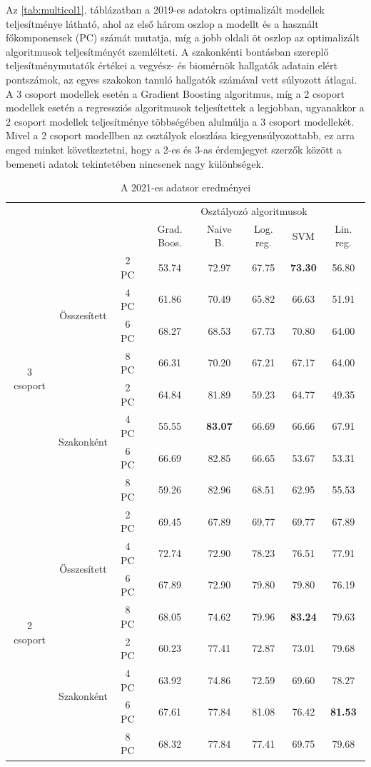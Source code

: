 \documentclass[12pt]{article}
\begin{document}
Az \ref{tab:multicol1}. táblázatban a 2019-es adatokra optimalizált modellek teljesítménye látható, ahol az első három oszlop a modellt és a használt főkomponensek (PC) számát mutatja, míg a jobb oldali öt oszlop az optimalizált algoritmusok teljesítményét szemlélteti. A szakonkénti bontásban szereplő teljesítménymutatók értékei a vegyész- és biomérnök hallgatók adatain elért pontszámok, az egyes szakokon tanuló hallgatók számával vett súlyozott átlagai. A 3 csoport modellek esetén a Gradient Boosting algoritmus, míg a 2 csoport modellek esetén a regressziós algoritmusok teljesítettek a legjobban, ugyanakkor a 2 csoport modellek teljesítménye többségében alulmúlja a 3 csoport modellekét. Mivel a 2 csoport modellben az osztályok eloszlása kiegyensúlyozottabb, ez arra enged minket következtetni, hogy a 2-es és 3-as érdemjegyet szerzők között a bemeneti adatok tekintetében nincsenek nagy különbségek.

\begin{table}[H]
\centering
\begin{tabular}{ccc|ccccc}

    &&&\multicolumn{5}{c}{Osztályozó algoritmusok} \\
    &&& Grad. Boos. &  Naive B. & Log. reg.  &  SVM & Lin. reg. \\ 
        \hline
    \multirow{8}{*}{3 csoport}& \multirow{4}{*}{Összesített}&2 PC&53.74&72.97&67.75&\textbf{73.30}&56.80 \\
    												&&4 PC&61.86&70.49&65.82&66.63&51.91\\
    												&&6 PC&68.27&68.53&67.73&70.80&64.00\\
    												&&8 PC&66.31&70.20&67.21&67.17&64.00\\\cline{3-8}%
    						 & \multirow{4}{*}{Szakonként}&2 PC&64.84&81.89&59.23&64.77&49.35\\
    												&&4 PC&55.55&\textbf{83.07}&66.69&66.66&67.91\\
    												&&6 PC&66.69&82.85&66.65&53.67&53.31\\
    												&&8 PC&59.26&82.96&68.51&62.95&55.53\\
    \hline
    \hline
    \multirow{8}{*}{2 csoport}& \multirow{4}{*}{Összesített}&2 PC&69.45&67.89&69.77&69.77&67.89 \\
    												&&4 PC&72.74&72.90&78.23&76.51&77.91\\
    												&&6 PC&67.89&72.90&79.80&79.80&76.19\\
    												&&8 PC&68.05&74.62&79.96&\textbf{83.24}&79.63\\\cline{3-8}
    						 & \multirow{4}{*}{Szakonként}&2 PC&60.23&77.41&72.87&73.01&79.68\\
    												&&4 PC&63.92&74.86&72.59&69.60&78.27\\
    												&&6 PC&67.61&77.84&81.08&76.42&\textbf{81.53}\\
    												&&8 PC&68.32&77.84&77.41&69.75&79.68\\
    												\hline
\end{tabular}
\caption{A 2021-es adatsor eredményei}
\label{tab:multicol2}
\end{table}
\end{document}

